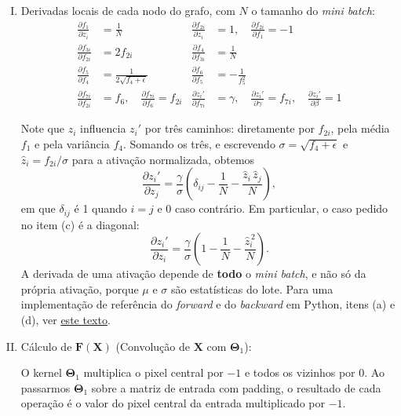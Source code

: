 \documentclass{dlproblemset}
\begin{document}
\begin{enumerate}[I)]
   \item Derivadas locais de cada nodo do grafo, com $N$ o tamanho do \textit{mini batch}:
   \begin{align*}
       \frac{\partial f_1}{\partial z_i} &= \frac{1}{N} &
       \frac{\partial f_{2i}}{\partial z_i} &= 1, \quad \frac{\partial f_{2i}}{\partial f_1} = -1 \\
       \frac{\partial f_{3i}}{\partial f_{2i}} &= 2 f_{2i} &
       \frac{\partial f_4}{\partial f_{3i}} &= \frac{1}{N} \\
       \frac{\partial f_5}{\partial f_4} &= \frac{1}{2\sqrt{f_4+\epsilon}} &
       \frac{\partial f_6}{\partial f_5} &= -\frac{1}{f_5^2} \\
       \frac{\partial f_{7i}}{\partial f_{2i}} &= f_6, \quad \frac{\partial f_{7i}}{\partial f_6} = f_{2i} &
       \frac{\partial z_i'}{\partial f_{7i}} &= \gamma, \quad \frac{\partial z_i'}{\partial \gamma} = f_{7i}, \quad \frac{\partial z_i'}{\partial \beta} = 1
   \end{align*}

   Note que $z_i$ influencia $z_i'$ por três caminhos: diretamente por $f_{2i}$, pela média $f_1$ e pela variância $f_4$. Somando os três, e escrevendo $\sigma = \sqrt{f_4+\epsilon}$ e $\hat{z}_i = f_{2i}/\sigma$ para a ativação normalizada, obtemos
   \begin{equation*}
       \frac{\partial z_i'}{\partial z_j} = \frac{\gamma}{\sigma}\left(\delta_{ij} - \frac{1}{N} - \frac{\hat{z}_i\,\hat{z}_j}{N}\right),
   \end{equation*}
   em que $\delta_{ij}$ é 1 quando $i = j$ e 0 caso contrário. Em particular, o caso pedido no item (c) é a diagonal:
   \begin{equation*}
       \frac{\partial z_i'}{\partial z_i} = \frac{\gamma}{\sigma}\left(1 - \frac{1}{N} - \frac{\hat{z}_i^{\,2}}{N}\right).
   \end{equation*}
   A derivada de uma ativação depende de \textbf{todo} o \textit{mini batch}, e não só da própria ativação, porque $\mu$ e $\sigma$ são estatísticas do lote. Para uma implementação de referência do \textit{forward} e do \textit{backward} em Python, itens (a) e (d), ver \href{https://kratzert.github.io/2016/02/12/understanding-the-gradient-flow-through-the-batch-normalization-layer.html}{este texto}.

        \item Cálculo de $\mathbf{F}(\mathbf{X})$ (Convolução de $\mathbf{X}$ com $\mathbf{\Theta}_1$):

O kernel $\mathbf{\Theta}_1$ multiplica o pixel central por $-1$ e todos os vizinhos por $0$. Ao passarmos $\mathbf{\Theta}_1$ sobre a matriz de entrada com padding, o resultado de cada operação é o valor do pixel central da entrada multiplicado por $-1$.


\end{enumerate}
\end{document}
